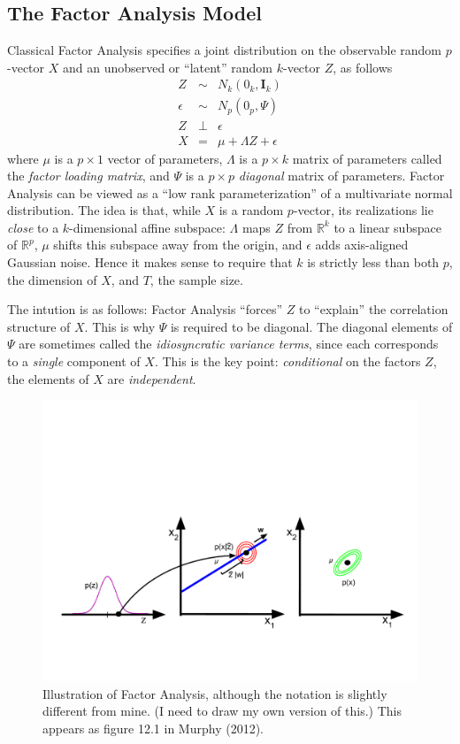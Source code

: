 \subsection{The Factor Analysis Model}
Classical Factor Analysis specifies a joint distribution on the observable random $p$-vector $X$ and an unobserved or ``latent'' random $k$-vector $Z$, as follows
	\begin{eqnarray*}
		Z &\sim& N_k(0_k, \mathbf{I}_k)\\
		\epsilon &\sim& N_p(0_p, \Psi)\\
		Z &\perp& \epsilon\\
		X &=& \mu + \Lambda Z + \epsilon
	\end{eqnarray*}
where $\mu$ is a $p\times 1$ vector of parameters, $\Lambda$ is a $p\times k$ matrix of parameters called the \emph{factor loading matrix}, and $\Psi$ is a $p\times p$ \emph{diagonal} matrix of parameters. Factor Analysis can be viewed as a ``low rank parameterization'' of a multivariate normal distribution. The idea is that, while $X$ is a random $p$-vector, its realizations lie \emph{close} to a $k$-dimensional affine subspace: $\Lambda$ maps $Z$ from $\mathbb{R}^k$ to a linear subspace of $\mathbb{R}^p$, $\mu$ shifts this subspace away from the origin, and $\epsilon$ adds axis-aligned Gaussian noise. Hence it makes sense to require that $k$ is strictly less than both $p$, the dimension of $X$, and $T$, the sample size. 

The intution is as follows: Factor Analysis ``forces'' $Z$ to ``explain'' the correlation structure of $X$. This is why $\Psi$ is required to be diagonal. The diagonal elements of $\Psi$ are sometimes called the \emph{idiosyncratic variance terms}, since each corresponds to a \emph{single} component of $X$. This is the key point: \emph{conditional} on the factors $Z$, the elements of $X$ are \emph{independent}. 
\begin{figure}
	\includegraphics[scale=0.5]{../img/factor_analysis}
	\caption{Illustration of Factor Analysis, although the notation is slightly different from mine. (I need to draw my own version of this.) This appears as figure 12.1 in Murphy (2012).}
\end{figure}

